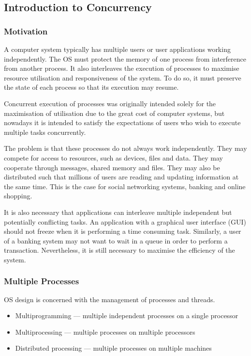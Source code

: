 \subsection{Introduction to Concurrency}

\subsubsection{Motivation}

A computer system typically has multiple users or user applications working independently.
The OS must protect the memory of one process from interference from another process.
It also interleaves the execution of processes to maximise resource utilisation and responsiveness of the system.
To do so, it must preserve the state of each process so that its execution may resume.

Concurrent execution of processes was originally intended solely for the maximisation of utilisation due to the great cost of computer systems, but nowadays it is intended to satisfy the expectations of users who wish to execute multiple tasks concurrently.

The problem is that these processes do not always work independently.
They may compete for access to resources, such as devices, files and data.
They may cooperate through messages, shared memory and files.
They may also be distributed such that millions of users are reading and updating information at the same time.
This is the case for social networking systems, banking and online shopping.

It is also necessary that applications can interleave multiple independent but potentially conflicting tasks.
An application with a graphical user interface (GUI) should not freeze when it is performing a time consuming task.
Similarly, a user of a banking system may not want to wait in a queue in order to perform a transaction.
Nevertheless, it is still necessary to maximise the efficiency of the system.

\subsubsection{Multiple Processes}

OS design is concerned with the management of processes and threads.
\begin{itemize}
  \item Multiprogramming --- multiple independent processes on a single processor
  \item Multiprocessing --- multiple processes on multiple processors
  \item Distributed processing --- multiple processes on multiple machines
\end{itemize}

